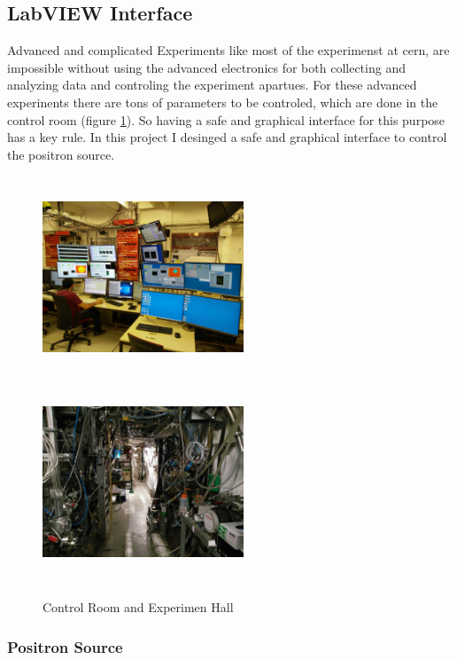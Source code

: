 \documentclass[12pt,a4paper]{article}
\begin{document}
\newpage


\subsection{LabVIEW Interface}

Advanced and complicated Experiments like most of the experimenst at cern, are impossible without using the advanced electronics for both collecting and analyzing data and controling the experiment apartues. For these advanced experinents there are tons of parameters to be controled, which are done in the control room (figure \ref{control}). 
So having a safe and graphical interface for this purpose has a key rule. In this project I desinged a safe and graphical interface to control the positron source. 

\begin{figure}[h]
\centering
\includegraphics[width=60mm, height=60mm]{control_room}
\includegraphics[width=60mm, height=60mm]{experiment_hall}
\caption{Control Room and Experimen Hall}
\label{control}
\end{figure}




\subsubsection{Positron Source}
\end{document}

